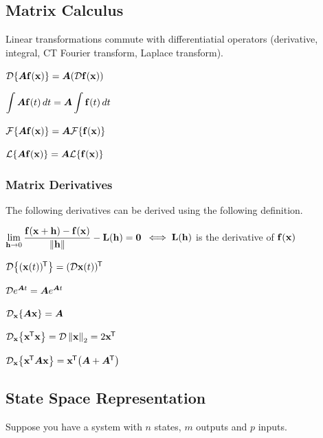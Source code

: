 \documentclass[11pt]{article}
\begin{document}
  \pagebreak

  \subsection{Matrix Calculus}

  Linear transformations commute with differentiatial operators (derivative, integral, CT Fourier transform, Laplace transform).

  \vspace{12pt}

  \(\mathcal{D} {\left\{ \bm{A}\mathbf{f}{\left( \mathbf{x} \right)} \right\}} = \bm{A}{\left( \mathcal{D} \mathbf{f}{\left( \mathbf{x} \right)} \right)}\)

  \(\displaystyle \int \bm{A}\mathbf{f}(t)\,dt = \bm{A} \int\mathbf{f}(t)\,dt\)

  \(\mathcal{F} {\left\{ \bm{A}\mathbf{f}{\left( \mathbf{x} \right)} \right\}} = \bm{A}\mathcal{F} {\left\{ \mathbf{f}{\left( \mathbf{x} \right)} \right\}}\)

  \(\mathcal{L} {\left\{ \bm{A}\mathbf{f}{\left( \mathbf{x} \right)} \right\}} = \bm{A}\mathcal{L} {\left\{ \mathbf{f}{\left( \mathbf{x} \right)} \right\}}\)

  \subsubsection{Matrix Derivatives}

  The following derivatives can be derived using the following  definition.

  \(\displaystyle \lim_{\mathbf{h} \to 0}
  \dfrac{\mathbf{f}(\mathbf{x} + \mathbf{h}) - \mathbf{f}(\mathbf{x})}{\left\lVert\mathbf{h}\right\rVert} - \mathbf{L}(\mathbf{h}) = \mathbf{0}\)
  \(\iff \mathbf{L}(\mathbf{h})\) is the derivative of \(\mathbf{f}(\mathbf{x})\)

  \vspace{12pt}

  \(\mathcal{D} {\left\{ (\mathbf{x}(t))^{\mkern-1.5mu\mathsf{T}} \right\}} = (\mathcal{D}\mathbf{x}(t))^{\mkern-1.5mu\mathsf{T}}\)

  \(\mathcal{D} e^{\bm{A}t}  = \bm{A}e^{\bm{A}t} \)

  \(\mathcal{D}_{\mathbf{x}}{\left\{ \bm{A}\mathbf{x} \right\}} = \bm{A}\)

  \(\mathcal{D}_{\mathbf{x}}{\left\{ \mathbf{x}^{\mkern-1.5mu\mathsf{T}}\mathbf{x} \right\}} = \mathcal{D}\left\lVert\mathbf{x}\right\rVert_2 = 2\mathbf{x}^{\mkern-1.5mu\mathsf{T}}\)

  \(\mathcal{D}_{\mathbf{x}}{\left\{ \mathbf{x}^{\mkern-1.5mu\mathsf{T}} \bm{A}\mathbf{x} \right\}} = \mathbf{x}^{\mkern-1.5mu\mathsf{T}}{\left( \bm{A} + \bm{A}^{\mkern-1.5mu\mathsf{T}} \right)}\)

  \pagebreak

  \subsection{State Space Representation}

  Suppose you have a system with \(n\) states, \(m\) outputs and \(p\) inputs.
\end{document}
